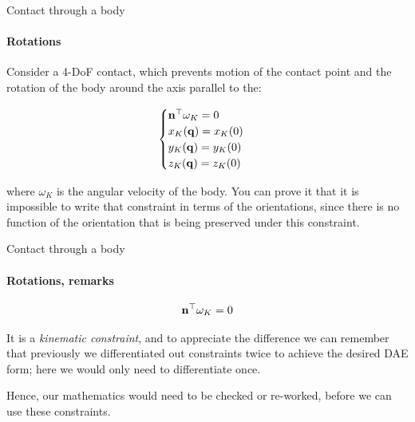 \documentclass{beamer}
\begin{document}
\begin{frame}{Contact through a body}
\framesubtitle{Rotations}
\begin{flushleft}

Consider a 4-DoF contact, which prevents motion of the contact point and the rotation of the body around the axis parallel to the: 


\begin{equation}
    \begin{cases}
    \mathbf{n}^\top \omega_K = 0 \\  
    x_K(\mathbf{q}) = x_K(0) \\
    y_K(\mathbf{q}) = y_K(0) \\
    z_K(\mathbf{q}) = z_K(0)
    \end{cases}
\end{equation}

where $\omega_K$ is the angular velocity of the body. You can prove it that it is impossible to write that constraint in terms of the orientations, since there is no function of the orientation that is being preserved under this constraint. 

\end{flushleft}
\end{frame}



\begin{frame}{Contact through a body}
\framesubtitle{Rotations, remarks}
\begin{flushleft}

\begin{equation}
    \mathbf{n}^\top \omega_K = 0
\end{equation}

It is a \emph{kinematic constraint}, and to appreciate the difference we can remember that previously we differentiated out constraints twice to achieve the desired DAE form; here we would only need to differentiate once.

\bigskip

Hence, our mathematics would need to be checked or re-worked, before we can use these constraints.

\end{flushleft}
\end{frame}
\end{document}
